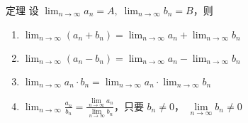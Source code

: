 \begin{Theorem}[极限算法定理]{定理}
设 $\lim_{n\to\infty}a_n=A,\; \lim_{n\to\infty}b_n=B$，则
\begin{enumerate}[itemsep=10pt]
    \item\label{itm:theorem1} $\displaystyle \lim_{n\to\infty}(a_n+b_n)=\lim_{n\to\infty}a_n+\lim_{n\to\infty}b_n$
    \item\label{itm:theorem2} $\displaystyle \lim_{n\to\infty}(a_n-b_n)=\lim_{n\to\infty}a_n-\lim_{n\to\infty}b_n$
    \item\label{itm:theorem3} $\displaystyle \lim_{n\to\infty}a_n\cdot b_n=\lim_{n\to\infty}a_n\cdot \lim_{n\to\infty}b_n$
    \item\label{itm:theorem4} $\displaystyle \lim_{n\to\infty}\frac{a_n}{b_n}=\frac{\lim\limits_{n\to\infty}a_n}{\lim\limits_{n\to\infty}b_n}$，只要 $b_n\ne 0$， $\lim\limits_{n\to\infty}b_n\ne 0$
\end{enumerate}
 \end{Theorem}

